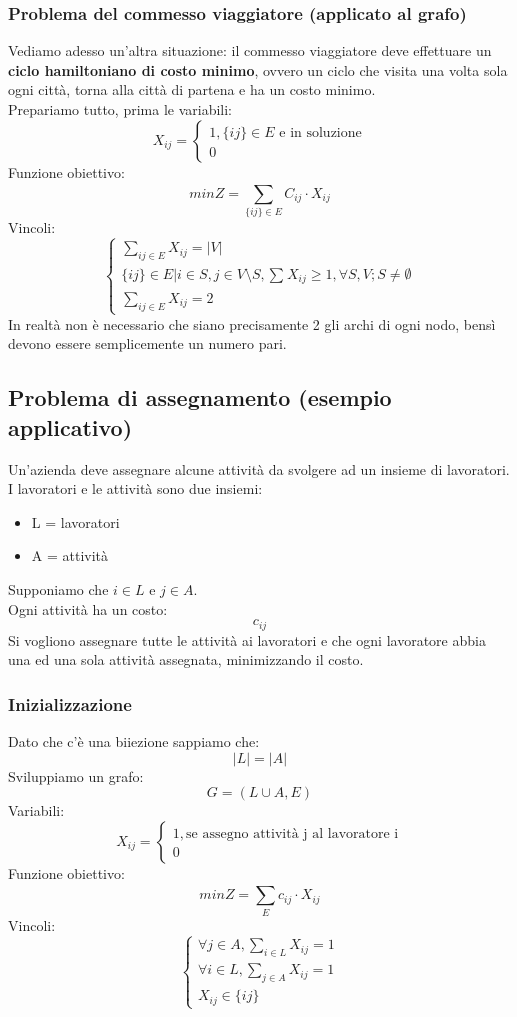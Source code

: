\documentclass[12pt,a4paper]{article}
\begin{document}
\subsubsection{Problema del commesso viaggiatore (applicato al grafo)}
Vediamo adesso un'altra situazione: il commesso viaggiatore deve effettuare un \textbf{ciclo hamiltoniano di costo minimo}, ovvero un ciclo che visita una volta sola ogni città, torna alla città di partena e ha un costo minimo.\\
Prepariamo tutto, prima le variabili:
\[
X_{ij} = \begin{cases}
    1, \{ij\} \in E \text{ e in soluzione}\\
    0
\end{cases}
\]
Funzione obiettivo:
\[
minZ = \sum_{\{ij\} \in E}^{} C_{ij} \cdot X_{ij}
\]
Vincoli:
\[
\begin{cases}
    \sum_{ij \in E}^{} X_{ij} = |V|\\
    \{ij\} \in E | i \in S, j \in V \setminus S, \sum_{}^{} X_{ij} \geq 1, \forall S,V; S \ne \emptyset\\
    \sum_{ij \in E}^{} X_{ij} = 2
\end{cases}
\]
In realtà non è necessario che siano precisamente 2 gli archi di ogni nodo, bensì devono essere semplicemente un numero pari.
\subsection{Problema di assegnamento (esempio applicativo)}
Un'azienda deve assegnare alcune attività da svolgere ad un insieme di lavoratori. I lavoratori e le attività sono due insiemi:
\begin{itemize}
    \item L = lavoratori
    \item A = attività
\end{itemize}
Supponiamo che $i \in L$ e $j \in A$.\\
Ogni attività ha un costo:
\[
c_{ij}
\]
Si vogliono assegnare tutte le attività ai lavoratori e che ogni lavoratore abbia una ed una sola attività assegnata, minimizzando il costo.
\subsubsection{Inizializzazione}
Dato che c'è una biiezione sappiamo che:
\[
|L| = |A|
\]
Sviluppiamo un grafo:
\[
G = (L \cup A, E)
\]
Variabili:
\[
X_{ij} = \begin{cases}
    1, \text{se assegno attività j al lavoratore i}\\
    0
\end{cases}
\]
Funzione obiettivo:
\[
minZ = \sum_{E}^{} c_{ij} \cdot X_{ij}
\]
Vincoli:
\[
\begin{cases}
    \forall j \in A, \sum_{i \in L}^{} X_{ij} = 1\\
    \forall i \in L, \sum_{j \in A}^{} X_{ij} = 1\\
    X_{ij} \in \{ij\}
\end{cases}
\]
\end{document}
